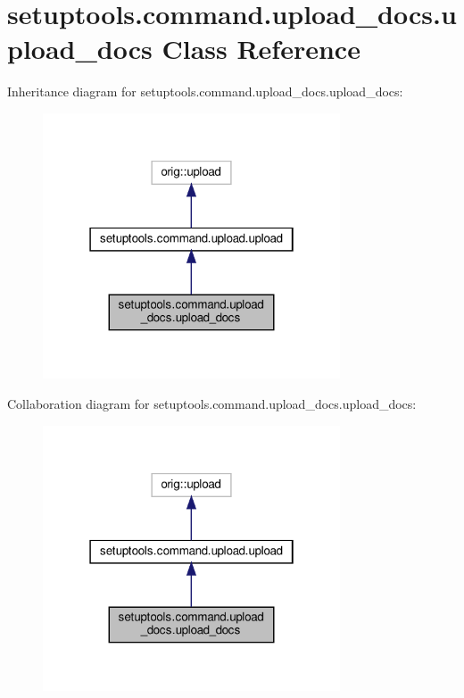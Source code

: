 \hypertarget{classsetuptools_1_1command_1_1upload__docs_1_1upload__docs}{}\section{setuptools.\+command.\+upload\+\_\+docs.\+upload\+\_\+docs Class Reference}
\label{classsetuptools_1_1command_1_1upload__docs_1_1upload__docs}


Inheritance diagram for setuptools.\+command.\+upload\+\_\+docs.\+upload\+\_\+docs\+:
\nopagebreak
\begin{figure}[H]
\begin{center}
\leavevmode
\includegraphics[width=250pt]{classsetuptools_1_1command_1_1upload__docs_1_1upload__docs__inherit__graph}
\end{center}
\end{figure}


Collaboration diagram for setuptools.\+command.\+upload\+\_\+docs.\+upload\+\_\+docs\+:
\nopagebreak
\begin{figure}[H]
\begin{center}
\leavevmode
\includegraphics[width=250pt]{classsetuptools_1_1command_1_1upload__docs_1_1upload__docs__coll__graph}
\end{center}
\end{figure}
